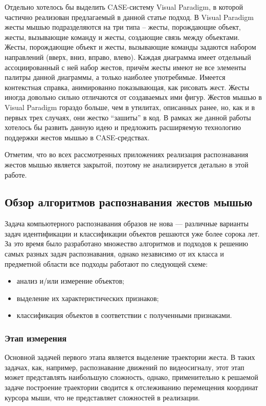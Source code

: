 \documentclass[a5paper]{article}
\begin{document}
Отдельно хотелось бы выделить CASE-систему Visual Paradigm, в которой частично реализован предлагаемый в данной статье подход. В Visual Paradigm жесты мышью подразделяются на три типа – жесты, порождающие объект, жесты, вызывающие команду и жесты, создающие связь между объектами. Жесты, порождающие объект и жесты, вызывающие команды задаются набором направлений (вверх, вниз, вправо, влево). Каждая диаграмма имеет отдельный ассоциированный с ней набор жестов, причём жесты имеют не все элементы палитры данной диаграммы, а только наиболее употребимые. Имеется контекстная справка, анимированно показывающая, как рисовать жест. Жесты иногда довольно сильно отличаются от создаваемых ими фигур. Жестов мышью в Visual Paradigm гораздо больше, чем в  утилитах, описанных ранее, но, как и в первых трех случаях, они жестко ``зашиты'' в код. В рамках же данной работы хотелось бы развить данную идею и предложить расширяемую технологию поддержки жестов мышью в CASE-средствах.

Отметим, что во всех рассмотренных приложениях реализация распознавания жестов мышью является закрытой, поэтому не анализируется детально в этой работе.

\subsection{Обзор алгоритмов распознавания жестов мышью}
Задача компьютерного распознавания образов не нова --- различные варианты задач идентификации и классификации объектов решаются уже более сорока лет. За это время было разработано множество алгоритмов и подходов к решению самых разных задач распознавания, однако независимо от их класса и предметной области все подходы работают по следующей схеме: 
\begin{itemize}
  \item анализ и/или измерение объектов;
  \item выделение их характеристических признаков;
  \item классификация объектов в соответствии с полученными признаками.
\end{itemize}

\subsubsection{Этап измерения}
Основной задачей первого этапа является выделение траектории жеста. В таких задачах, как, например, распознавание движений по видеосигналу, этот этап может представлять наибольшую сложность, однако, применительно к решаемой задаче построение траектории сводится к отслеживанию перемещения координат курсора мыши, что не представляет сложностей в реализации. 
\end{document}
